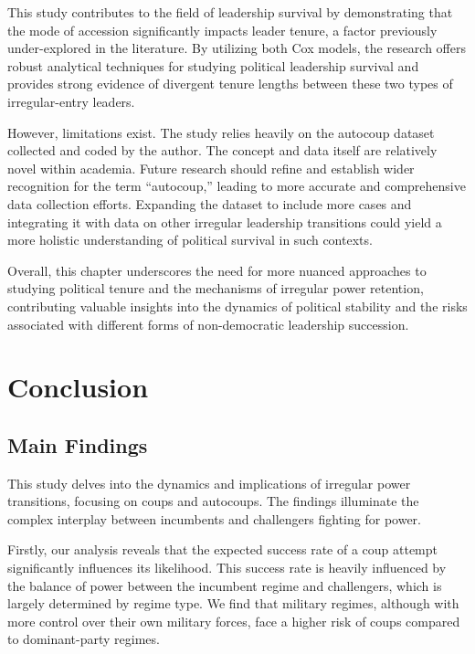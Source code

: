 \documentclass[
  12pt,
]{report}
\begin{document}
This study contributes to the field of leadership survival by
demonstrating that the mode of accession significantly impacts leader
tenure, a factor previously under-explored in the literature. By
utilizing both Cox models, the research offers robust analytical
techniques for studying political leadership survival and provides
strong evidence of divergent tenure lengths between these two types of
irregular-entry leaders.

However, limitations exist. The study relies heavily on the autocoup
dataset collected and coded by the author. The concept and data itself
are relatively novel within academia. Future research should refine and
establish wider recognition for the term ``autocoup,'' leading to more
accurate and comprehensive data collection efforts. Expanding the
dataset to include more cases and integrating it with data on other
irregular leadership transitions could yield a more holistic
understanding of political survival in such contexts.

Overall, this chapter underscores the need for more nuanced approaches
to studying political tenure and the mechanisms of irregular power
retention, contributing valuable insights into the dynamics of political
stability and the risks associated with different forms of
non-democratic leadership succession.

\chapter{Conclusion}\label{conclusion-3}

\section{Main Findings}\label{main-findings}

This study delves into the dynamics and implications of irregular power
transitions, focusing on coups and autocoups. The findings illuminate
the complex interplay between incumbents and challengers fighting for
power.

Firstly, our analysis reveals that the expected success rate of a coup
attempt significantly influences its likelihood. This success rate is
heavily influenced by the balance of power between the incumbent regime
and challengers, which is largely determined by regime type. We find
that military regimes, although with more control over their own
military forces, face a higher risk of coups compared to dominant-party
regimes.
\end{document}
